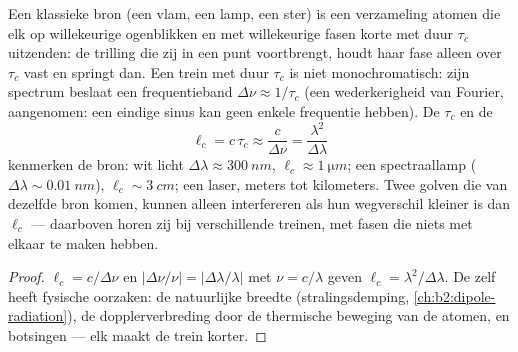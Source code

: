 \begin{proposition}\label{prop:b2:scalar-light-model:coherence}
Een klassieke bron (een vlam, een lamp, een ster) is een verzameling atomen
die elk op willekeurige ogenblikken en met willekeurige fasen korte
\emph{} met duur $\tau_c$ uitzenden: de trilling die zij in een
punt voortbrengt, houdt haar fase alleen over $\tau_c$ vast en springt dan.
Een trein met duur $\tau_c$ is niet monochromatisch: zijn spectrum beslaat
een frequentieband $\Delta\nu \approx 1/\tau_c$ (een wederkerigheid van
Fourier, aangenomen: een eindige sinus kan geen enkele frequentie hebben).
De \emph{} $\tau_c$ en de \emph{}
\[
\ell_c = c\,\tau_c \approx \frac c{\Delta\nu} = \frac{\lambda^2}{\Delta\lambda}
\]
kenmerken de bron: wit licht $\Delta\lambda \approx \qty{300}{nm}$,
$\ell_c
\approx \qty{1}{\micro m}$; een spectraallamp
($\Delta\lambda \sim \qty{0.01}{nm}$), $\ell_c \sim
\qty{3}{cm}$; een laser,
meters tot kilometers. Twee golven die van dezelfde bron komen, kunnen
alleen interfereren als hun wegverschil kleiner is dan $\ell_c$ ---
daarboven horen zij bij verschillende treinen, met fasen die niets met
elkaar te maken hebben.
\end{proposition}

\begin{proof}
$\ell_c = c/\Delta\nu$ en $|\Delta\nu/\nu| = |\Delta\lambda/\lambda|$ met
$\nu = c/\lambda$ geven $\ell_c =
\lambda^2/\Delta\lambda$. De  zelf heeft fysische oorzaken: de natuurlijke breedte
(stralingsdemping, \cref{ch:b2:dipole-radiation}), de dopplerverbreding door
de thermische beweging van de atomen, en botsingen --- elk maakt de trein
korter.
\end{proof}

